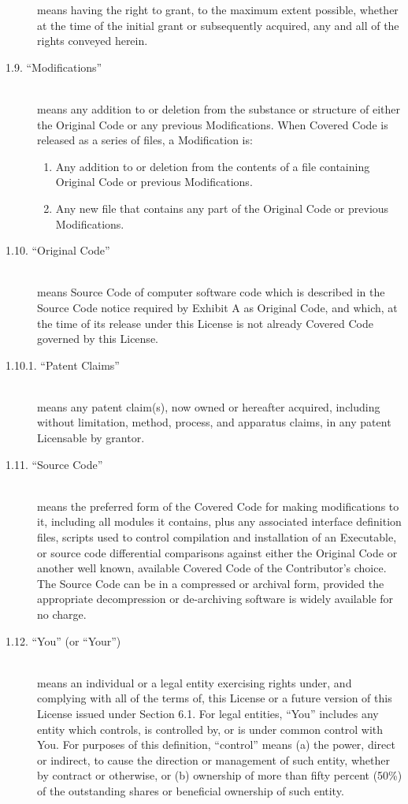 \documentclass{book}
\begin{document}
\begin{description}
means having the right to grant, to the maximum extent possible, whether at the time of the initial grant or subsequently acquired, any and all of the rights conveyed herein. 
\item [1.9. ``Modifications'']\mbox{}\\
means any addition to or deletion from the substance or structure of either the Original Code or any previous Modifications. When Covered Code is released as a series of files, a Modification is: 
\renewcommand{\theenumi}{\alph{enumi}}
\begin{enumerate}
\item Any addition to or deletion from the contents of a file containing Original Code or previous Modifications. 
\item Any new file that contains any part of the Original Code or previous Modifications. 
\end{enumerate}

\item [1.10. ``Original Code'']\mbox{}\\
means Source Code of computer software code which is described in the Source Code notice required by Exhibit A as Original Code, and which, at the time of its release under this License is not already Covered Code governed by this License. 

\item [1.10.1. ``Patent Claims'']\mbox{}\\
means any patent claim(s), now owned or hereafter acquired, including without limitation, method, process, and apparatus claims, in any patent Licensable by grantor. 
\item [1.11. ``Source Code'']\mbox{}\\
means the preferred form of the Covered Code for making modifications to it, including all modules it contains, plus any associated interface definition files, scripts used to control compilation and installation of an Executable, or source code differential comparisons against either the Original Code or another well known, available Covered Code of the Contributor's choice. The Source Code can be in a compressed or archival form, provided the appropriate decompression or de-archiving software is widely available for no charge. 
\item [1.12. ``You'' (or ``Your'')]\mbox{}\\
means an individual or a legal entity exercising rights under, and complying with all of the terms of, this License or a future version of this License issued under Section 6.1. For legal entities, ``You'' includes any entity which controls, is controlled by, or is under common control with You. For purposes of this definition, ``control'' means (a) the power, direct or indirect, to cause the direction or management of such entity, whether by contract or otherwise, or (b) ownership of more than fifty percent (50\%) of the outstanding shares or beneficial ownership of such entity. 
\end{description}
\end{document}
